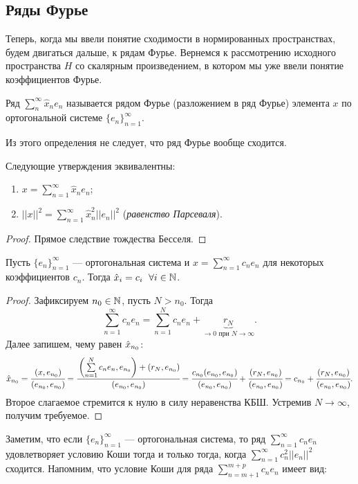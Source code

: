 \subsection{Ряды Фурье}
Теперь, когда мы ввели понятие сходимости в нормированных пространствах, будем двигаться дальше, к рядам Фурье. Вернемся к рассмотрению исходного пространства $H$ со скалярным произведением, в котором мы уже ввели понятие коэффициентов Фурье.
\begin{Def}
    Ряд $\sum\limits_{n}^{\infty} \hat{x}_ne_n$ называется рядом Фурье (разложением в ряд Фурье) элемента $x$ по ортогональной системе $\{e_n\}_{n=1}^{\infty}$.
\end{Def}
Из этого определения не следует, что ряд Фурье вообще сходится.
\begin{Statement}
    Следующие утверждения эквивалентны:
    \begin{enumerate}
        \item $x = \sum\limits_{n=1}^{\infty} \hat{x}_ne_n$;
        \item $||x||^2 = \sum\limits_{n=1}^{\infty} \hat{x}^2_n ||e_n||^2$ (\textit{равенство Парсеваля}).
    \end{enumerate}
\end{Statement}
\begin{proof}
    Прямое следствие тождества Бесселя.
\end{proof}
\begin{Statement}
    Пусть $\{e_n\}_{n=1}^{\infty}$ --- ортогональная система и $x = \sum\limits_{n=1}^{\infty}c_n e_n$ для некоторых коэффициентов $c_n$. Тогда $\hat{x}_i = c_i\;\ \forall i \in \mathbb{N}$.
\end{Statement}
\begin{proof}
    Зафиксируем $n_0\in \mathbb{N}$, пусть $N>n_0$. Тогда
    $$
        \sum\limits_{n=1}^{\infty} c_ne_n = \sum \limits_{n=1}^{N}c_n e_n + \underbrace{r_N}_{\to 0 \text{ при } N\to \infty}.
    $$
    Далее запишем, чему равен $\hat{x}_{n_0}$:
    $$
        \hat{x}_{n_0} = \cfrac{(x,e_{n_0})}{(e_{n_0}, e_{n_0})} = \cfrac{\left(\sum\limits_{n=1}^{N} c_ne_n, e_{n_0}\right) + \left(r_N, e_{n_0}\right)}{(e_{n_0}, e_{n_0})} = \cfrac{c_{n_0}(e_{n_0}, e_{n_0})}{(e_{n_0}, e_{n_0})} + \cfrac{(r_N, e_{n_0})}{(e_{n_0}, e_{n_0})} = c_{n_0} + \cfrac{(r_N, e_{n_0})}{(e_{n_0}, e_{n_0})}.
    $$
    Второе слагаемое стремится к нулю в силу неравенства КБШ. Устремив $N \to \infty$, получим требуемое.
\end{proof}
Заметим, что если $\{e_n\}_{n=1}^{\infty}$ --- ортогональная система, то ряд $\sum\limits_{n=1}^{\infty} c_n e_n$ удовлетворяет условию Коши тогда и только тогда, когда $\sum\limits_{n=1}^{\infty}c_n^2||e_n||^2$ сходится. Напомним, что условие Коши для ряда $\sum\limits_{n=m+1}^{m+p}c_ne_n$ имеет вид:
